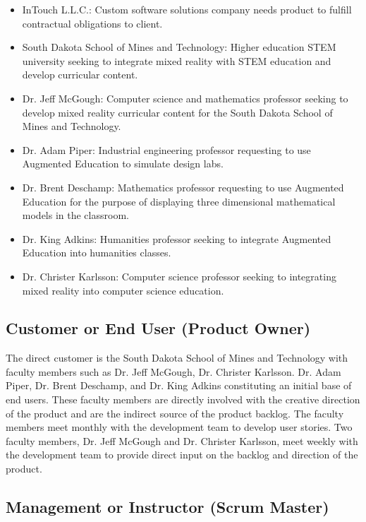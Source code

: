 \begin{itemize}
	\item InTouch L.L.C.: Custom software solutions company needs product to fulfill contractual obligations to client. 
	\item South Dakota School of Mines and Technology: Higher education STEM university seeking to integrate mixed reality with STEM education and develop curricular content.
	\item Dr. Jeff McGough: Computer science and mathematics professor seeking to develop mixed reality curricular content for the South Dakota School of Mines and Technology. 
	\item Dr. Adam Piper: Industrial engineering professor requesting to use Augmented Education to simulate design labs.
	\item Dr. Brent Deschamp: Mathematics professor requesting to use Augmented Education for the purpose of displaying three dimensional mathematical models in the classroom. 
	\item Dr. King Adkins: Humanities professor seeking to integrate Augmented Education into humanities classes. 
	\item Dr. Christer Karlsson: Computer science professor seeking to integrating mixed reality into computer science education.
\end{itemize}


\subsection{Customer or End User (Product Owner)}

The direct customer is the South Dakota School of Mines and Technology with faculty members such as Dr. Jeff McGough, Dr. Christer Karlsson. Dr. Adam Piper, Dr. Brent Deschamp, and Dr. King Adkins constituting an initial base of end users. These faculty members are directly involved with the creative direction of the product and are the indirect source of the product backlog. The faculty members meet monthly with the development team to develop user stories. Two faculty members, Dr. Jeff McGough and Dr. Christer Karlsson, meet weekly with the development team to provide direct input on the backlog and direction of the product. 

\subsection{Management or Instructor (Scrum Master)}

